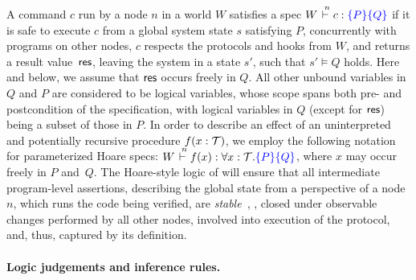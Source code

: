 A command $c$ run by a node $n$ in a world $W$ satisfies a spec
$W \vd{n} c : \pre{P}\post{Q}$ if it is safe to execute $c$ from a
global system state $s$ satisfying $P$, concurrently with programs on
other nodes, $c$ respects the protocols and hooks from $W$, and
returns a result value~$\mathsf{res}$, leaving the system in a state $s'$,
such that $s' \vDash Q$ holds.
%
Here and below, we assume that $\mathsf{res}$ occurs freely in $Q$. All other
unbound variables in $Q$ and $P$ are considered to be logical
variables, whose scope spans both pre- and postcondition of the
specification, with logical variables in $Q$ (except for $\mathsf{res}$) being
a subset of those in $P$.
%
In order to describe an effect of an uninterpreted and potentially
recursive procedure $f(x : \mathcal{T})$, we employ the following notation
for parameterized Hoare specs:
$W \vd{n} f(x) : \forall x : \Type. \pre{P}\post{Q}$, where $x$ may
occur freely in $P$ and~$Q$.
%
The Hoare-style logic of \disel will ensure that all intermediate
program-level assertions, describing the global state from a
perspective of a node $n$, which runs the code being verified, are
\emph{stable}~\cite{Jones:TOPLAS83,Vafeiadis-Parkinson:CONCUR07}, \ie,
closed under observable changes performed by all other nodes, involved
into execution of the protocol, and, thus, captured by its definition.
%

\paragraph{Logic judgements and inference rules.~}

